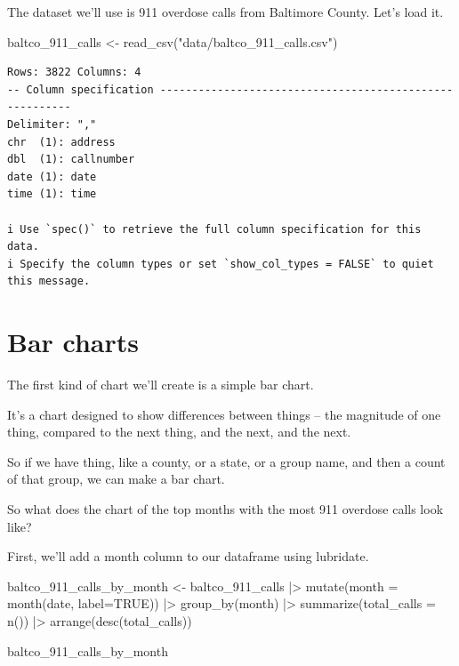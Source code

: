 \documentclass[
  letterpaper,
  DIV=11,
  numbers=noendperiod]{scrreprt}
\newenvironment{Shaded}{\begin{snugshade}}{\end{snugshade}}
\newcommand{\AttributeTok}[1]{\textcolor[rgb]{0.40,0.45,0.13}{#1}}
\newcommand{\ConstantTok}[1]{\textcolor[rgb]{0.56,0.35,0.01}{#1}}
\newcommand{\FunctionTok}[1]{\textcolor[rgb]{0.28,0.35,0.67}{#1}}
\newcommand{\NormalTok}[1]{\textcolor[rgb]{0.00,0.23,0.31}{#1}}
\newcommand{\OtherTok}[1]{\textcolor[rgb]{0.00,0.23,0.31}{#1}}
\newcommand{\SpecialCharTok}[1]{\textcolor[rgb]{0.37,0.37,0.37}{#1}}
\newcommand{\StringTok}[1]{\textcolor[rgb]{0.13,0.47,0.30}{#1}}
\begin{document}
The dataset we'll use is 911 overdose calls from Baltimore County. Let's
load it.

\begin{Shaded}
\begin{Highlighting}[]
\NormalTok{baltco\_911\_calls }\OtherTok{\textless{}{-}} \FunctionTok{read\_csv}\NormalTok{(}\StringTok{"data/baltco\_911\_calls.csv"}\NormalTok{)}
\end{Highlighting}
\end{Shaded}

\begin{verbatim}
Rows: 3822 Columns: 4
-- Column specification --------------------------------------------------------
Delimiter: ","
chr  (1): address
dbl  (1): callnumber
date (1): date
time (1): time

i Use `spec()` to retrieve the full column specification for this data.
i Specify the column types or set `show_col_types = FALSE` to quiet this message.
\end{verbatim}

\hypertarget{bar-charts}{%
\section{Bar charts}\label{bar-charts}}

The first kind of chart we'll create is a simple bar chart.

It's a chart designed to show differences between things -- the
magnitude of one thing, compared to the next thing, and the next, and
the next.

So if we have thing, like a county, or a state, or a group name, and
then a count of that group, we can make a bar chart.

So what does the chart of the top months with the most 911 overdose
calls look like?

First, we'll add a month column to our dataframe using lubridate.

\begin{Shaded}
\begin{Highlighting}[]
\NormalTok{baltco\_911\_calls\_by\_month }\OtherTok{\textless{}{-}}\NormalTok{ baltco\_911\_calls }\SpecialCharTok{|\textgreater{}}
  \FunctionTok{mutate}\NormalTok{(}\AttributeTok{month =} \FunctionTok{month}\NormalTok{(date, }\AttributeTok{label=}\ConstantTok{TRUE}\NormalTok{)) }\SpecialCharTok{|\textgreater{}} 
  \FunctionTok{group\_by}\NormalTok{(month) }\SpecialCharTok{|\textgreater{}} 
  \FunctionTok{summarize}\NormalTok{(}\AttributeTok{total\_calls =} \FunctionTok{n}\NormalTok{()) }\SpecialCharTok{|\textgreater{}} 
  \FunctionTok{arrange}\NormalTok{(}\FunctionTok{desc}\NormalTok{(total\_calls))}

\NormalTok{baltco\_911\_calls\_by\_month}
\end{Highlighting}
\end{Shaded}
\end{document}
